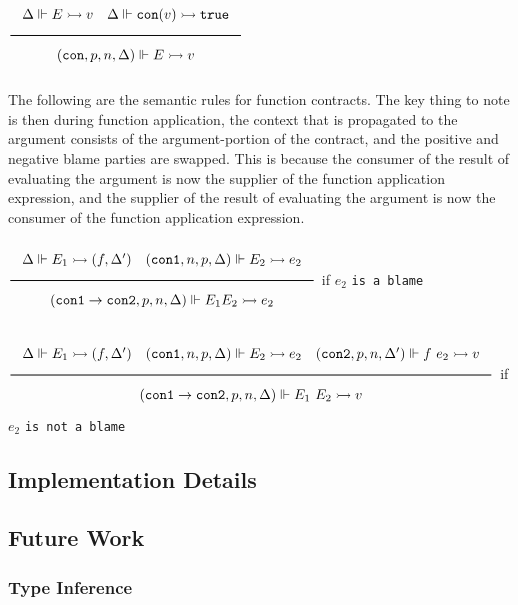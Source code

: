 \documentclass[a4paper]{article}
\newcommand{\Rule}[2]{\genfrac{}{}{0.7pt}{}{{\setlength{\fboxrule}{0pt}\setlength{\fboxsep}{3mm}\fbox{$#1$}}}{{\setlength{\fboxrule}{0pt}\setlength{\fboxsep}{3mm}\fbox{$#2$}}}}
\newcommand{\TruE}{\texttt{true}}
\newcommand{\eval}{\rightarrowtail}
\newcommand{\under}{\Vdash}
\newcommand{\flatCon}{\texttt{con}}
\newcommand{\funCon}{\texttt{con1} \rightarrow \texttt{con2}}
\newcommand{\conA}{\texttt{con1}}
\newcommand{\conB}{\texttt{con2}}
\begin{document}
$\Rule{\Delta \under E \eval v \quad \Delta \under \flatCon(v) \eval \TruE}
{(\flatCon, p, n, \Delta) \under E \eval v}$

The following are the semantic rules for function contracts. The key thing to note is then during
function application, the context that is propagated to the argument consists of the argument-portion of the contract,
and the positive and negative blame parties are swapped. This is because the consumer of the result of evaluating the argument
is now the supplier of the function application expression, and the supplier of the result of evaluating the argument
is now the consumer of the function application expression.

$\Rule{\Delta \under E_1 \eval (f, \Delta') \quad (\conA, n, p, \Delta) \under E_2 \eval e_2}
{(\funCon, p, n, \Delta) \under E_1 E_2 \eval e_2}$ if $e_2$ \texttt{is a blame}

$\Rule{\Delta \under E_1 \eval (f, \Delta') \quad (\conA, n, p, \Delta) \under E_2 \eval e_2 \quad (\conB, p, n, \Delta') \under f\ e_2 \eval v }
{(\funCon, p, n, \Delta) \under E_1\ E_2 \eval v}$ if $e_2$ \texttt{is not a blame}

\subsection{Implementation Details}

\subsection{Future Work}

\subsubsection{Type Inference}



\end{document}
